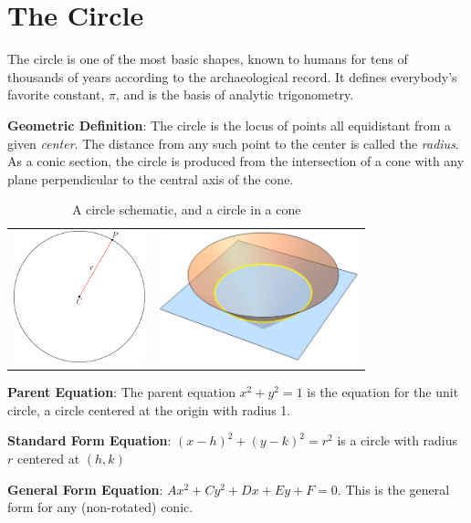 \documentclass[
]{article}
\author{}
\date{}
\let\oldsection\section
\renewcommand{\section}[1]{\clearpage\oldsection{#1}}
\begin{document}
\hypertarget{the-circle}{%
\section{The Circle}\label{the-circle}}

The circle is one of the most basic shapes, known to humans for tens of
thousands of years according to the archaeological record. It defines
everybody's favorite constant, \(\pi\), and is the basis of analytic
trigonometry.

\textbf{Geometric Definition}: The circle is the locus of points all
equidistant from a given \emph{center}. The distance from any such point
to the center is called the \emph{radius}. As a conic section, the circle is produced
from the intersection of a cone with any plane perpendicular to the central axis of
the cone.

\begin{table}[ht]
	\centering
	\begin{tabular}{cc}
		\includegraphics[width=\textwidth,height=1.5in]{fig-circle.pdf} &
		\includegraphics[width=\textwidth,height=1.5in]{fcc.pdf}
	\end{tabular}
	\caption*{A circle schematic, and a circle in a cone}
\end{table}


\textbf{Parent Equation}: The parent equation \(x^2+y^2=1\) is the
equation for the unit circle, a circle centered at the origin with
radius 1.

\textbf{Standard Form Equation}: \((x-h)^2 + (y-k)^2 = r^2\) is a circle
with radius \(r\) centered at \((h,k)\)

\textbf{General Form Equation}: \(Ax^2+Cy^2+Dx+Ey+F=0\). This is the
general form for any (non-rotated) conic.
\end{document}
